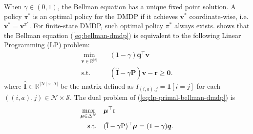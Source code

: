 \documentclass[12pt]{article}
\begin{document}
When $\gamma \in (0,1)$, the Bellman equation has a unique fixed point solution. A policy $\pi^*$ is an optimal policy for the DMDP if it achieves $\boldsymbol{v}^*$ coordinate-wise, i.e. $\boldsymbol{v}^* = \boldsymbol{v}^{\pi^*}$. For finite-state DMDP, such optimal policy $\pi^*$ always exists. \cite{puterman2014markov} shows that the Bellman equation (\ref{eq:bellman-dmdp}) is equivalent to the following Linear Programming (LP) problem:
\begin{equation}
    \label{eq:lp-primal-bellman-dmdp}
    \begin{aligned}
        \min_{\boldsymbol{v}\in \mathbb
        {R}^{|\mathcal{S}|}} \quad & (1 - \gamma) \boldsymbol{q}^{\top} \boldsymbol{v} \\
        \text{s.t.} \quad & (\hat{\boldsymbol{\text{I}}} - \gamma \boldsymbol{\text{P}}) \boldsymbol{v} - \boldsymbol{\text{r}} \ge \boldsymbol{0}.
    \end{aligned}
\end{equation}
where $\hat{\boldsymbol{\text{I}}} \in \mathbb{R}^{|\mathcal{N}| \times|\mathcal{S}|}$ be the matrix defined as $I_{(i,a),j} = \boldsymbol{1}[i = j]$ for each $((i,a),j)\in \mathcal{N} \times \mathcal{S}$. The dual problem of (\ref{eq:lp-primal-bellman-dmdp}) is 
\begin{equation}
    \label{eq:lp-dual-bellman-dmdp}
    \begin{aligned}
        \textcolor{black}{\max_{\boldsymbol{\mu}\in \Delta^N}} \quad &  \boldsymbol{\mu}^{\top} \boldsymbol{\text{r}} \\
        \text{s.t.} \quad &  (\hat{\boldsymbol{\text{I}}} - \gamma \boldsymbol{\text{P}})^{\top} \boldsymbol{\mu} = (1 - \gamma) \boldsymbol{q}.
    \end{aligned}
\end{equation}
\end{document}
